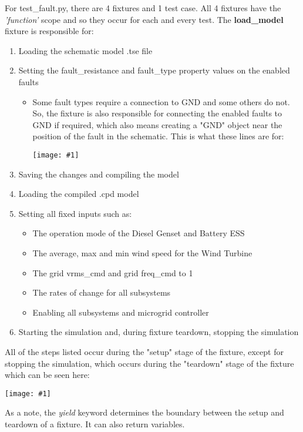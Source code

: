 \documentclass{article}
\newcommand{\imageheight}{2cm}
\newcommand{\centerimage}[2]{%
    \begin{center}
        \centerline{\texttt{[image: \#1]}}
    \end{center}%
}
\begin{document}
 For test\_fault.py, there are 4 fixtures and 1 test case. All 4 fixtures have the \textit{'function'} scope and so they occur for each and every test. The \textbf{load\_model} fixture is responsible for:
 
\begin{enumerate}
    \item Loading the schematic model .tse file
    \item Setting the fault\_resistance and fault\_type property values on the enabled faults
    \begin{itemize}
        \item Some fault types require a connection to GND and some others do not. So, the fixture is also responsible for connecting the enabled faults to GND if required, which also means creating a "GND" object near the position of the fault in the schematic. This is what these lines are for:
        \centerimage{gndcomponent.png}{\imageheight}
    \end{itemize}
    \item Saving the changes and compiling the model
    \item Loading the compiled .cpd model
    \item Setting all fixed inputs such as:
    \begin{itemize}
        \item The operation mode of the Diesel Genset and Battery ESS
        \item The average, max and min wind speed for the Wind Turbine
        \item The grid vrms\_cmd and grid freq\_cmd to 1 
        \item The rates of change for all subsystems
        \item Enabling all subsystems and microgrid controller
    \end{itemize}
    \item Starting the simulation and, during fixture teardown, stopping the simulation
\end{enumerate}

All of the steps listed occur during the "setup" stage of the fixture, except for stopping the simulation, which occurs during the "teardown" stage of the fixture which can be seen here: 
    \centerimage{startandstop.png}{\imageheight}
    
As a note, the \textit{yield} keyword determines the boundary between the setup and teardown of a fixture. It can also return variables.
\end{document}
